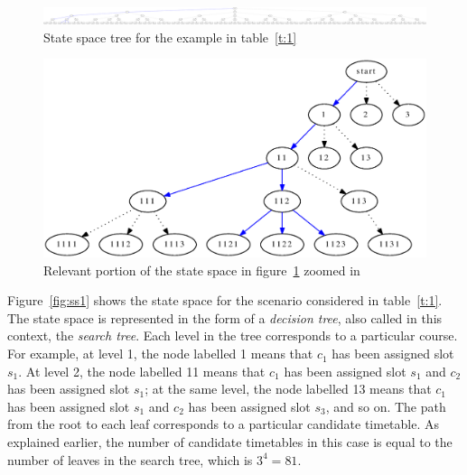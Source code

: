 \documentclass[11pt,a4paper]{article}
\begin{document}
\begin{figure}
\begin{center}
\includegraphics[width=.9\textheight, angle=90]{images/ss2.eps}
\end{center}
\caption{State space tree for the example in table~\ref{t:1}}
\label{fig:ss2}
\end{figure} 


\begin{figure}
\begin{center}
\includegraphics[width=.5\textwidth]{images/ss2-zoom.eps}
\end{center}
\caption{Relevant portion of the state space in figure~\ref{fig:ss2} zoomed in}
\label{fig:ss2-zoom}
\end{figure} 

Figure~\ref{fig:ss1} shows the state space for the scenario considered in table~\ref{t:1}. The state space is represented in the form of a \emph{decision tree}, also called in this context, the \emph{search tree}. Each level in the tree corresponds to a particular course. For example, at level 1, the node labelled 1 means that $c_1$ has been assigned slot $s_1$. At level 2, the node labelled 11 means that $c_1$ has been assigned slot $s_1$ and $c_2$ has been assigned slot $s_1$; at the same level, the node labelled 13 means that $c_1$ has been assigned slot $s_1$ and $c_2$ has been assigned slot $s_3$, and so on. The path from the root to each leaf corresponds to a particular candidate timetable. As explained earlier, the number of candidate timetables in this case is equal to the number of leaves in the search tree, which is $3^4 = 81$.
\end{document}
